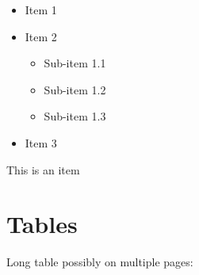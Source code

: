 \begin{itemize}
    \item Item 1
    \item Item 2
        \begin{itemize}
            \item Sub-item 1.1
            \item Sub-item 1.2
            \item Sub-item 1.3
        \end{itemize}
    \item Item 3
\end{itemize}
\bigbreak

\begin{basedescript}{%
  \desclabelstyle{\multilinelabel}
  \desclabelwidth{3cm}}

\item[This is an item] \lipsum[25] 

\end{basedescript}

\newpage


\section{Tables}

Long table possibly on multiple pages:

